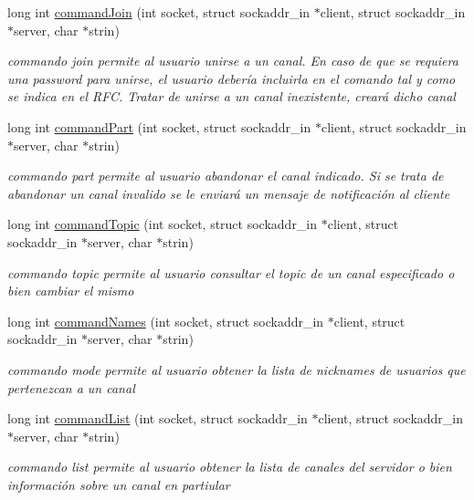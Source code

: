 \begin{DoxyCompactItemize}
long int \hyperlink{_g-2301-05-_p1-commands_8h_a520a20b8ad5887dd2b600682bb3ea36e}{command\-Join} (int socket, struct sockaddr\-\_\-in $\ast$client, struct sockaddr\-\_\-in $\ast$server, char $\ast$strin)
\begin{DoxyCompactList}\small\item\em commando join permite al usuario unirse a un canal. En caso de que se requiera una password para unirse, el usuario debería incluirla en el comando tal y como se indica en el R\-F\-C. Tratar de unirse a un canal inexistente, creará dicho canal \end{DoxyCompactList}\item 
long int \hyperlink{_g-2301-05-_p1-commands_8h_adadde8a5b5af849c55509d9e9aef8dc1}{command\-Part} (int socket, struct sockaddr\-\_\-in $\ast$client, struct sockaddr\-\_\-in $\ast$server, char $\ast$strin)
\begin{DoxyCompactList}\small\item\em commando part permite al usuario abandonar el canal indicado. Si se trata de abandonar un canal invalido se le enviará un mensaje de notificación al cliente \end{DoxyCompactList}\item 
long int \hyperlink{_g-2301-05-_p1-commands_8h_a2c3f4be0a8d40030d1e249075f96f4fe}{command\-Topic} (int socket, struct sockaddr\-\_\-in $\ast$client, struct sockaddr\-\_\-in $\ast$server, char $\ast$strin)
\begin{DoxyCompactList}\small\item\em commando topic permite al usuario consultar el topic de un canal especificado o bien cambiar el mismo \end{DoxyCompactList}\item 
long int \hyperlink{_g-2301-05-_p1-commands_8h_ab3b8ab89b3ae99edea8af60322538c1f}{command\-Names} (int socket, struct sockaddr\-\_\-in $\ast$client, struct sockaddr\-\_\-in $\ast$server, char $\ast$strin)
\begin{DoxyCompactList}\small\item\em commando mode permite al usuario obtener la lista de nicknames de usuarios que pertenezcan a un canal \end{DoxyCompactList}\item 
long int \hyperlink{_g-2301-05-_p1-commands_8h_a0ef7f97ab64eb311827dbe3509b071bb}{command\-List} (int socket, struct sockaddr\-\_\-in $\ast$client, struct sockaddr\-\_\-in $\ast$server, char $\ast$strin)
\begin{DoxyCompactList}\small\item\em commando list permite al usuario obtener la lista de canales del servidor o bien información sobre un canal en partiular \end{DoxyCompactList}\item 

\end{DoxyCompactItemize}
